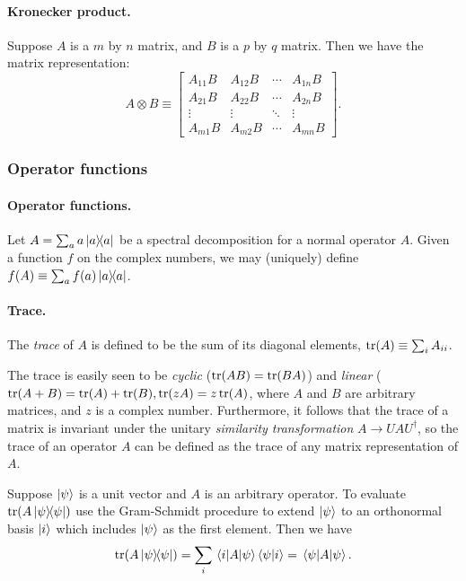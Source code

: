 \documentclass{article}
\numberwithin{theorem}{section}
\numberwithin{corollary}{section}
\begin{document}
\paragraph{Kronecker product.} Suppose $A$ is a $m$ by $n$ matrix, and $B$ is a
$p$ by $q$ matrix. Then we have the matrix representation: \[
  A \otimes B \equiv
  \begin{bmatrix}
    A_{11}B & A_{12}B & \cdots & A_{1n}B \\
    A_{21}B & A_{22}B & \cdots & A_{2n}B \\
    \vdots & \vdots & \ddots & \vdots \\
    A_{m1}B & A_{m2}B & \cdots & A_{mn}B
  \end{bmatrix}.
\]

\subsubsection{Operator functions}

\paragraph{Operator functions.} Let $A = \sum_a a\op{a}{a}$ be a spectral
decomposition for a normal operator $A$. Given a function $f$ on the complex
numbers, we may (uniquely) define $f(A) \equiv \sum_a f(a)\op{a}{a}$.

\paragraph{Trace.} The \emph{trace} of $A$ is defined to be the sum of its
diagonal elements, $\tr(A) \equiv \sum_i A_{ii}$.

The trace is easily seen to be \emph{cyclic} ($\tr(AB) = \tr(BA)$) and
\emph{linear} ($\tr(A + B) = \tr(A) + \tr(B), \tr(zA) = z\tr(A)$, where $A$ and
$B$ are arbitrary matrices, and $z$ is a complex number. Furthermore, it
follows that the trace of a matrix is invariant under the unitary
\emph{similarity transformation} $A \to UAU^{\dagger}$, so the trace of an
operator $A$ can be defined as the trace of any matrix representation of $A$.

Suppose $\ket{\psi}$ is a unit vector and $A$ is an arbitrary operator. To
evaluate $\tr(A\op{\psi}{\psi})$ use the Gram-Schmidt procedure to extend
$\ket{\psi}$ to an orthonormal basis $\ket{i}$ which includes $\ket{\psi}$ as
the first element. Then we have \[
  \tr(A\op{\psi}{\psi}) = \sum_i \mel{i}{A}{\psi}\ip{\psi}{i} =
  \mel{\psi}{A}{\psi}.
\]
\end{document}
